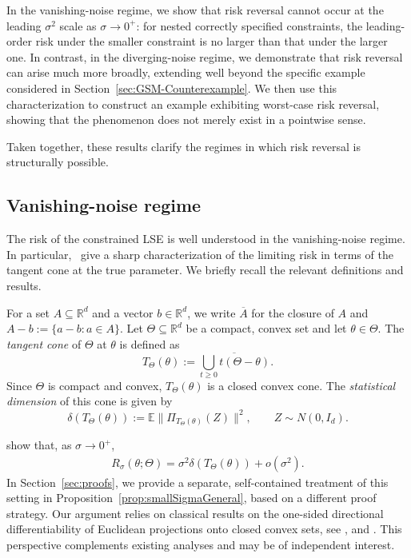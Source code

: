 \documentclass[11pt]{article}
\theoremstyle{plain}
\theoremstyle{definition}
\providecommand{\mathbbm}{\mathbb} %
\newcommand{\R}{\mathbbm{R}}
\newcommand{\E}{\mathbb{E}}
\begin{document}
In the vanishing-noise regime, we show that risk reversal cannot occur at the leading $\sigma^2$ scale as $\sigma\to0^+$: for nested correctly specified constraints, the leading-order risk under the smaller constraint is no larger than that under the larger one.
 In contrast, in the diverging-noise regime, we demonstrate that risk reversal can arise much more broadly, extending well beyond the specific example considered in Section~\ref{sec:GSM-Counterexample}. We then use this characterization to construct an example exhibiting worst-case risk reversal, showing that the phenomenon does not merely exist in a pointwise sense.

Taken together, these results clarify the regimes in which risk reversal is structurally possible.


\subsection{Vanishing-noise regime}\label{sec:vanishing-noise-asymptotic}
The risk of the constrained LSE is well understood in the vanishing-noise regime. In particular,~\cite{oymak2016sharp} give a sharp characterization of the limiting risk in terms of the tangent cone at the true parameter. We briefly recall the relevant definitions and results.

For a set $A \subseteq \R^d$ and a vector $b \in \R^d$, we write $\overline{A}$ for the closure of $A$ and $A - b := \{a - b : a \in A\}$. Let $\Theta \subseteq \R^d$ be a compact, convex set and let $\theta \in \Theta$. The \emph{tangent cone} of $\Theta$ at $\theta$ is defined as
\[
T_\Theta(\theta)
:=
\overline{\bigcup_{t \ge 0} t(\Theta - \theta)}.
\]
Since $\Theta$ is compact and convex, $T_\Theta(\theta)$ is a closed convex cone. The \emph{statistical dimension} of this cone is given by
\[
\delta(T_\Theta(\theta))
:=
\E\|\Pi_{T_\Theta(\theta)}(Z)\|^2,
\qquad
Z \sim N(0,I_d).
\]


\cite[Theorem~3.1]{oymak2016sharp} show that, as $\sigma \to 0^{+}$,
\begin{align*}
R_\sigma(\theta; \Theta)
=
\sigma^2\delta(T_\Theta(\theta))
+ o(\sigma^2).
\end{align*}
In Section~\ref{sec:proofs}, we provide a separate, self-contained treatment of this setting in Proposition~\ref{prop:smallSigmaGeneral}, based on a different proof strategy. Our argument relies on classical results on the one-sided directional differentiability of Euclidean projections onto closed convex sets, see \cite{zarantonello1971projections}, \cite{noll1995directional} and \cite{shapiro2016differentiability}. This perspective complements existing analyses and may be of independent interest.
\end{document}
